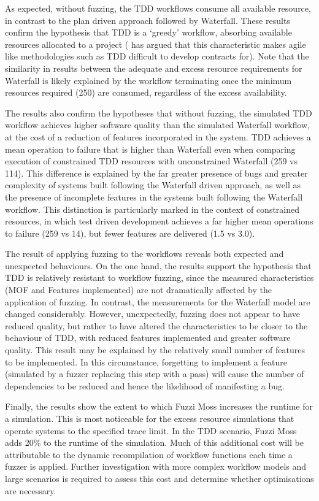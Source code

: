 \documentclass{sig-alternate}
\begin{document}
As expected, without fuzzing, the TDD workflows consume all available resource, in contrast to the plan driven approach
followed by Waterfall.  These results confirm the hypothesis that TDD is a `greedy' workflow, absorbing available
resources allocated to a project (\citet{sommerville10software} has argued that this characteristic makes agile like
methodologies such as TDD difficult to develop contracts for).  Note that the similarity in results between the adequate
and excess resource requirements for Waterfall is likely explained by the workflow terminating once the minimum
resources required (250) are consumed, regardless of the excess availability.

The results also confirm the hypotheses that without fuzzing, the simulated TDD workflow achieves higher software
quality than the simulated Waterfall workflow, at the cost of a reduction of features incorporated in the system.  TDD
achieves a mean operation to failure that is higher than Waterfall even when comparing execution of constrained TDD
resources with unconstrained Waterfall (259 vs 114).  This difference is explained by the far greater presence of bugs
and greater complexity of systems built following the Waterfall driven approach, as well as the presence of incomplete
features in the systems built following the Waterfall workflow.  This distinction is particularly marked in the context
of constrained resources, in which test driven development achieves a far higher mean operations to failure (259 vs 14),
but fewer features are delivered (1.5 vs 3.0).

The result of applying fuzzing to the workflows reveals both expected and unexpected behaviours.  On the one hand, the
results support the hypothesis that TDD is relatively resistant to workflow fuzzing, since the measured characteristics
(MOF and Features implemented) are not dramatically affected by the application of fuzzing.  In contrast, the
measurements for the Waterfall model are changed considerably.  However, unexpectedly, fuzzing does not appear to have
reduced quality, but rather to have altered the characteristics to be closer to the behaviour of TDD, with reduced
features implemented and greater software quality.  This result may be explained by the relatively small number of
features to be implemented.  In this circumstance, forgetting to implement a feature (simulated by a fuzzer replacing
this step with a pass) will cause the number of dependencies to be reduced and hence the likelihood of manifesting a
bug.

Finally, the results show the extent to which Fuzzi Moss increases the runtime for a simulation.  This is most
noticeable for the excess resource simulations that operate systems to the specified trace limit.  In the TDD scenario,
Fuzzi Moss adds 20\% to the runtime of the simulation.  Much of this additional cost will be attributable to the dynamic
recompilation of workflow functions each time a fuzzer is applied.  Further investigation with more complex workflow
models and large scenarios is required to assess this cost and determine whether optimisations are necessary.
\end{document}
